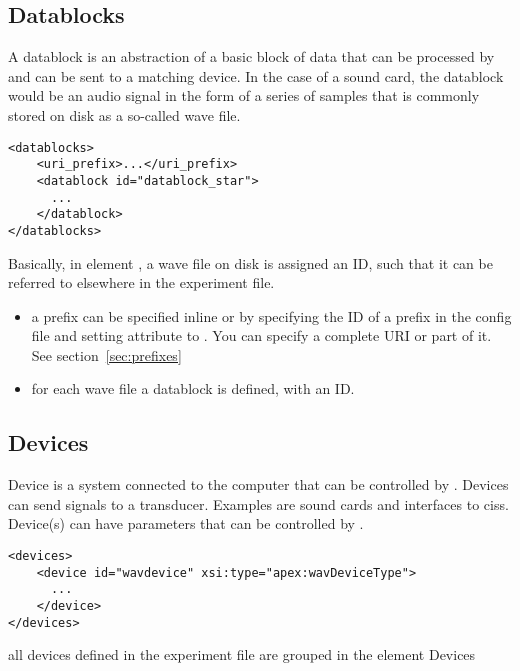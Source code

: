 \subsection{Datablocks}
\label{sec:datablocks}


A datablock is an abstraction of a basic block of data that can be
processed by \apex and can be sent to a matching device. In the
case of a sound card, the datablock would be an audio signal in
the form of a series of samples that is commonly stored on disk as
a so-called wave file.

\begin{lstlisting}
<datablocks>
    <uri_prefix>...</uri_prefix>
    <datablock id="datablock_star">
      ...
    </datablock>
</datablocks>
\end{lstlisting}

Basically, in element , a wave file on disk is
assigned an ID, such that it can be referred to elsewhere in the
experiment file.

\begin{itemize}
\item {} a prefix can be specified inline or by
specifying the ID of a prefix in the \apex config file and setting
attribute  to . You can specify
a complete URI or part of it. See section~\ref{sec:prefixes}

\item {} for each wave file a datablock is
defined, with an ID.
\end{itemize}

\subsection{Devices}
\label{sec:Devices}


Device is a system connected to the computer that can be
controlled by \apex. Devices can send signals to a transducer.
Examples are sound cards and interfaces to \ac{cis}s. Device(s)
can have parameters that can be controlled by \apex.

\begin{lstlisting}
<devices>
    <device id="wavdevice" xsi:type="apex:wavDeviceType">
      ...
    </device>
</devices>
\end{lstlisting}


 all devices defined in the experiment file are
grouped in the element Devices

